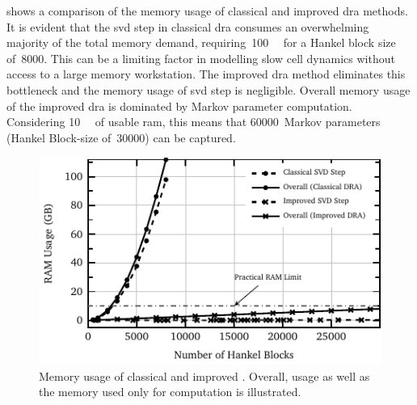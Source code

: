   shows a  comparison  of  the memory  usage  of classical  and
improved \gls{dra} methods.  It is evident that the \gls{svd}  step in classical
\gls{dra}  consumes  an  overwhelming  majority  of  the  total  memory  demand,
requiring~\approx\SI{100}{\giga\byte} for a Hankel block size of~8000. This can
be a limiting factor  in modelling slow cell dynamics without  access to a large
memory workstation. The improved \gls{dra} method eliminates this bottleneck and
the memory  usage of \gls{svd} step  is negligible. Overall memory  usage of the
improved  \gls{dra} is  dominated by  Markov parameter  computation. Considering
\SI{10}{\giga\byte} of usable \gls{ram}, this means that 60000~Markov parameters
(Hankel Block-size of~30000) can be captured.

\begin{figure}[!htbp]
    \centering
    \includegraphics{ram_usage.pdf}
    \caption[%
    Memory usage of classical and improved 
    ]%
    {%
        Memory  usage  of  classical and  improved  .  Overall,
          usage   as  well   as  the   memory  used   only  for
         computation is illustrated.
    }%
    \label{fig:memory}
\end{figure}

